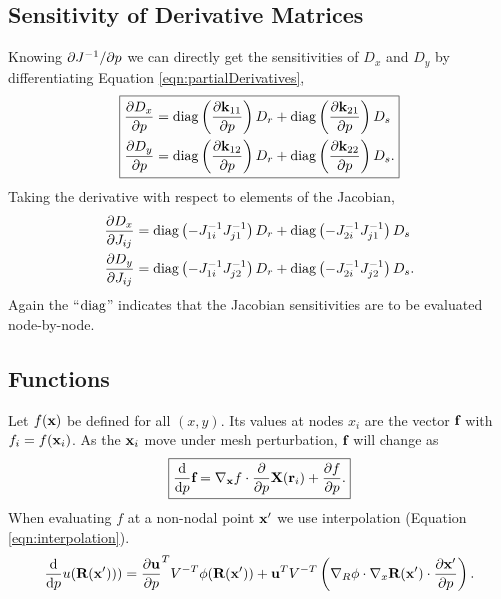 \subsection{Sensitivity of Derivative Matrices}

Knowing $\partial{J^{-1}}/\partial{p}$ we can directly get the sensitivities of $D_x$ and $D_y$ by differentiating Equation \ref{eqn:partialDerivatives},
%
\begin{equation}
\label{eqn:partialDerivativeSensitivities}
\boxed{
\begin{aligned}
\pp{D_x}{p} &= \diag \left( \pp{\ve k_{11}}{p} \right) D_r + \diag \left( \pp{\ve k_{21}}{p} \right) D_s \\
\pp{D_y}{p} &= \diag \left( \pp{\ve k_{12}}{p} \right) D_r + \diag \left( \pp{\ve k_{22}}{p} \right) D_s. \\
\end{aligned}
}%
\end{equation}
%
Taking the derivative with respect to elements of the Jacobian,
%
\begin{equation}
\begin{aligned}
\frac{\partial{D_x}}{\partial{J_{ij}}} &= \operatorname{diag} \left( -J^{-1}_{1i} J^{-1}_{j1} \right) D_r + \operatorname{diag} \left( -J^{-1}_{2i} J^{-1}_{j1} \right) D_s \\
\frac{\partial{D_y}}{\partial{J_{ij}}} &= \operatorname{diag} \left( -J^{-1}_{1i} J^{-1}_{j2} \right) D_r + \operatorname{diag} \left( -J^{-1}_{2i} J^{-1}_{j2} \right) D_s.
\end{aligned}
\end{equation}
%
Again the ``$\operatorname{diag}$'' indicates that the Jacobian sensitivities are to be evaluated node-by-node.

\subsection{Functions}

Let $f(\textbf{x})$ be defined for all $(x,y)$.  Its values at nodes $x_i$ are the vector $\textbf{f}$ with $f_i = f(\textbf{x}_i)$.  As the $\textbf{x}_i$ move under mesh perturbation, $\textbf{f}$ will change as
%
\begin{equation}
\boxed{
\frac{\mathrm{d}{}}{\mathrm{d}{p}} \textbf{f} = \nabla_{\textbf{x}} f \cdot \frac{\partial{}}{\partial{p}} \textbf{X}(\textbf{r}_i) + \frac{\partial{f}}{\partial{p}}.
}
\end{equation}
%
When evaluating $f$ at a non-nodal point $\textbf{x}'$ we use interpolation (Equation \ref{eqn:interpolation}).
%
\begin{equation}
\frac{\mathrm{d}{}}{\mathrm{d}{p}} u(\textbf{R}(\textbf{x}'))) = \frac{\partial{\textbf{u}}}{\partial{p}}^T V^{-T} \phi(\textbf{R}(\textbf{x}')) + \textbf{u}^T V^{-T} \left( \nabla_R \phi \cdot \nabla_x \textbf{R}(\textbf{x}') \cdot \frac{\partial{\textbf{x}'}}{\partial{p}} \right).
\end{equation}


